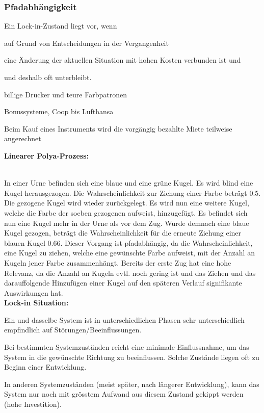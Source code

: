 \subsubsection{Pfadabhängigkeit}
Ein Lock-in-Zustand liegt vor, wenn
\begin{compactitem}
	\item auf Grund von Entscheidungen in der Vergangenheit
	\item eine Änderung der aktuellen Situation mit hohen Kosten verbunden ist und
	\item und deshalb oft unterbleibt.
\end{compactitem}
\begin{example}
	\begin{compactitem}
		\item billige Drucker und teure Farbpatronen
		\item Bonussysteme, Coop bis Lufthansa
		\item Beim Kauf eines Instruments wird die vorgängig bezahlte Miete teilweise angerechnet
	\end{compactitem}
\end{example}
\textbf{Linearer Polya-Prozess:} \\
 \\
In einer Urne befinden sich eine blaue und eine grüne Kugel. Es wird blind eine Kugel herausgezogen. Die Wahrscheinlichkeit zur Ziehung einer Farbe beträgt 0.5. Die gezogene Kugel wird wieder zurückgelegt. Es wird nun eine weitere Kugel, welche die Farbe der soeben gezogenen aufweist, hinzugefügt. Es befindet sich nun eine Kugel mehr in der Urne als vor dem Zug. Wurde demnach eine blaue Kugel gezogen, beträgt die Wahrscheinlichkeit für die erneute Ziehung einer blauen Kugel 0.66. Dieser Vorgang ist pfadabhängig, da die Wahrscheinlichkeit, eine Kugel zu ziehen, welche eine gewünschte Farbe aufweist, mit der Anzahl an Kugeln jener Farbe zusammenhängt. Bereits der erste Zug hat eine hohe Relevanz, da die Anzahl an Kugeln evtl. noch gering ist und das Ziehen und das darauffolgende Hinzufügen einer Kugel auf den späteren Verlauf signifikante Auswirkungen hat. \\
\textbf{Lock-in Situation:}
\begin{compactitem}
	\item Ein und dasselbe System ist in unterschiedlichen Phasen sehr unterschiedlich empfindlich auf Störungen/Beeinflussungen.
	\item Bei bestimmten Systemzuständen reicht eine minimale Einflussnahme, um das	System in die gewünschte Richtung zu	beeinflussen. Solche Zustände liegen oft zu Beginn einer Entwicklung.
	\item In anderen Systemzuständen (meist später,	nach längerer Entwicklung), kann das System	nur noch mit grösstem Aufwand aus diesem Zustand gekippt werden (hohe Investition).
\end{compactitem}